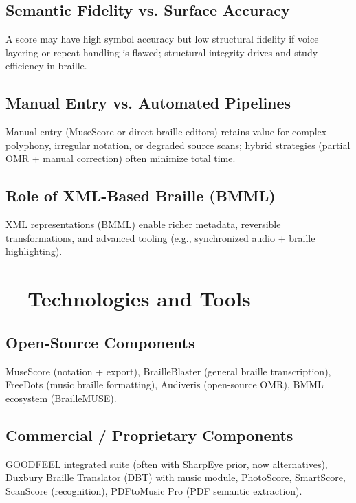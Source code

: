 \subsection{Semantic Fidelity vs. Surface Accuracy}
A score may have high symbol accuracy but low structural fidelity if voice layering or repeat handling is flawed; structural integrity drives  and study efficiency in braille.

\subsection{Manual Entry vs. Automated Pipelines}
Manual entry (MuseScore or direct braille editors) retains value for complex polyphony, irregular notation, or degraded source scans; hybrid strategies (partial \gls{OMR} + manual correction) often minimize total time.

\subsection{Role of XML-Based Braille (BMML)}
XML representations (BMML) enable richer metadata, reversible transformations, and advanced tooling (e.g., synchronized audio + braille highlighting).\supercite{braillemuse}

\section{~~Technologies and Tools}\label{ch10:sec:technologies-tools}
\subsection{Open-Source Components}
MuseScore (notation + export)\supercite{musescore-accessibility}, BrailleBlaster (general braille transcription)\supercite{aph-brailleblaster}, FreeDots (music braille formatting)\supercite{blindguru-freedots}, Audiveris (open-source \gls{OMR})\supercite{researchgate-polyphonic-omr, sachindae-polyphonic-omr}, BMML ecosystem (BrailleMUSE).\supercite{braillemuse}

\subsection{Commercial / Proprietary Components}
GOODFEEL integrated suite (often with SharpEye prior, now alternatives),\supercite{dancingdots-goodfeel} Duxbury Braille Translator (DBT) with music module,\supercite{DuxburyDBT} PhotoScore, SmartScore, ScanScore (recognition), PDFtoMusic Pro (PDF semantic extraction).


